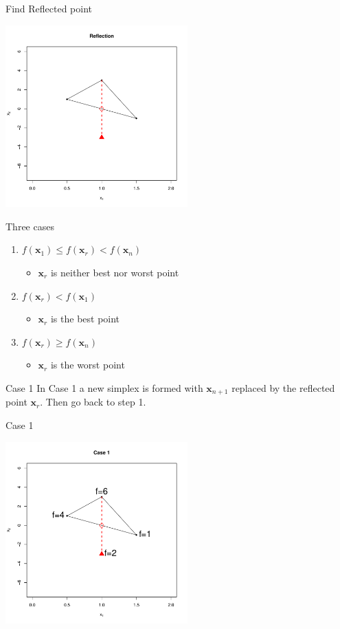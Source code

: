 \documentclass[10pt]{beamer}
\begin{document}
\begin{frame}{Find Reflected point}
  \begin{center}
    \includegraphics[height=7cm]{RCode/nmrefl1.pdf}
  \end{center}
\end{frame}
\begin{frame}{Three cases}
  \begin{enumerate}
  \item $f({\bm x_1})\leq f({\bm x_r})<f({\bm x_n})$
    \begin{itemize}
    \item ${\bm x_r}$ is neither best nor worst point
    \end{itemize}

  \item $f({\bm x_r})<f({\bm x_1})$
    \begin{itemize}
    \item ${\bm x_r}$ is the best point
    \end{itemize}

  \item $f({\bm x_r})\geq f({\bm x_n})$
    \begin{itemize}
    \item ${\bm x_r}$ is the worst point
    \end{itemize}
  \end{enumerate}
\end{frame}
\begin{frame}{Case 1}
  In Case 1 a new simplex is formed with ${\bm x_{n+1}}$ replaced by the reflected point ${\bm x_{r}}$.  Then go back to step 1.
\end{frame}
\begin{frame}{Case 1}
  \begin{center}
    \includegraphics[height=7cm]{RCode/nmrefl2.pdf}
  \end{center}
\end{frame}
\end{document}

